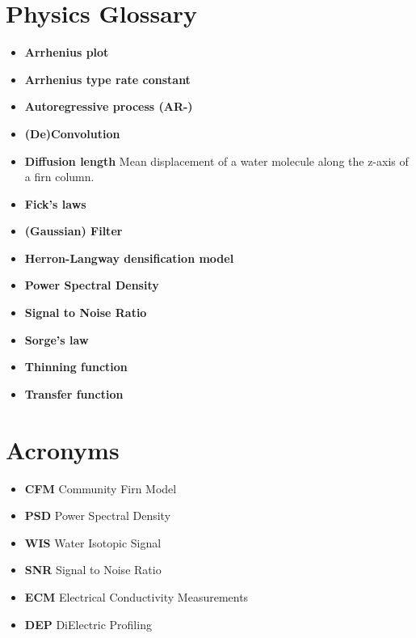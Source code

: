 \documentclass[11pt]{article}
\begin{document}
\section{Physics Glossary}
\begin{itemize}
	\item \textbf{Arrhenius plot}
	
	\item \textbf{Arrhenius type rate constant}
	
	\item \textbf{Autoregressive process (AR-)} 
	
	\item \textbf{(De)Convolution}
	
	\item \textbf{Diffusion length} Mean displacement of a water molecule along the z-axis of a firn column.

	\item \textbf{Fick's laws}

	\item \textbf{(Gaussian) Filter}

	\item \textbf{Herron-Langway densification model}

	\item \textbf{Power Spectral Density}

	\item \textbf{Signal to Noise Ratio}

	\item \textbf{Sorge's law}

	\item \textbf{Thinning function}

	\item \textbf{Transfer function}
\end{itemize}

\section{Acronyms}
\begin{itemize}
	\item \textbf{CFM} Community Firn Model

	\item \textbf{PSD} Power Spectral Density

	\item \textbf{WIS} Water Isotopic Signal

	\item \textbf{SNR} Signal to Noise Ratio
	
	\item \textbf{ECM} Electrical Conductivity Measurements
	
	\item \textbf{DEP} DiElectric Profiling 
\end{itemize}
\end{document}
